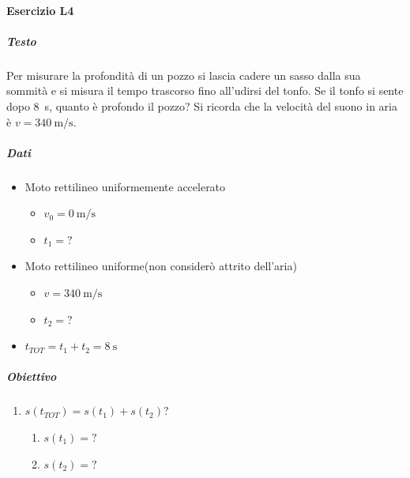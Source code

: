 \documentclass{article}
\begin{document}
\paragraph*{Esercizio L4}
\subparagraph*{Testo}
Per misurare la profondità di un pozzo si lascia cadere un sasso dalla sua sommità e si misura il tempo trascorso fino all'udirsi del tonfo. Se il tonfo si sente dopo \SI{8}{\second}, quanto è profondo il pozzo? Si ricorda che la velocità del suono in aria è \( v = \SI{340}{\meter\per\second} \).
\subparagraph*{Dati}
\begin{itemize}
    \item Moto rettilineo uniformemente accelerato
          \begin{itemize}
              \item $v_0 = \SI{0}{\meter\per\second}$
              \item $t_1 = ?$
          \end{itemize}
    \item Moto rettilineo uniforme(non considerò attrito dell'aria)
          \begin{itemize}
              \item $v = \SI{340}{\meter\per\second}$
              \item $t_2 =?$
          \end{itemize}
    \item $t_{TOT} = t_1 + t_2 = \SI{8}{\second}$
\end{itemize}

\subparagraph*{Obiettivo}
\begin{enumerate}
    \item[(a)] $s(t_{TOT}) = s(t_1) + s(t_2)?$
          \begin{enumerate}
              \item[(a.1)] $s(t_1) = ?$
              \item[(a.2)] $s(t_2) = ?$
          \end{enumerate}
\end{enumerate}
\end{document}
